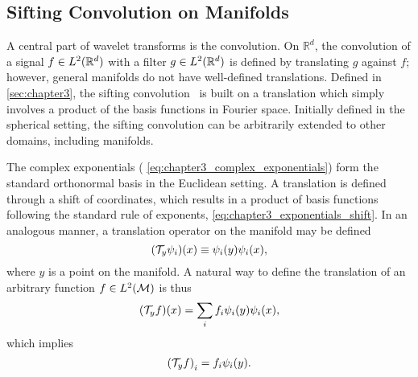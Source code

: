 \subsection{Sifting Convolution on Manifolds}\label{sec:chapter5_sifting_convolution_manifolds}

A central part of wavelet transforms is the convolution.
On \(\mathbb{R}^{d}\), the convolution of a signal \(f \in L^{2}(\mathbb{R}^{d})\) with a filter \(g \in L^{2}(\mathbb{R}^{d})\) is defined by translating \(g\) against \(f\); however, general manifolds do not have well-defined translations.
Defined in \cref{sec:chapter3}, the sifting convolution~\cite{Roddy2021} is built on a translation which simply involves a product of the basis functions in Fourier space.
Initially defined in the spherical setting, the sifting convolution can be arbitrarily extended to other domains, including manifolds.

The complex exponentials (\eg{} \cref{eq:chapter3_complex_exponentials}) form the standard orthonormal basis in the Euclidean setting.
A translation is defined through a shift of coordinates, which results in a product of basis functions following the standard rule of exponents, \ie{} \cref{eq:chapter3_exponentials_shift}.
In an analogous manner, a translation operator on the manifold may be defined
%
\begin{equation}
	(\mathcal{T}_{y}\psi_{i})(x)
	\equiv \psi_{i}(y) \psi_{i}(x),
\end{equation}
%
where \(y\) is a point on the manifold.
A natural way to define the translation of an arbitrary function \(f \in L^{2}(\mathcal{M})\) is thus
%
\begin{equation}\label{eq:chapter5_translation_mesh}
	(\mathcal{T}_{y}f)(x)
	= \sum\limits_{i} f_{i} \psi_{i}(y) \psi_{i}(x),
\end{equation}
%
which implies
%
\begin{equation}
	{(\mathcal{T}_{y}f)}_{i}
	= f_{i} \psi_{i}(y).
\end{equation}

